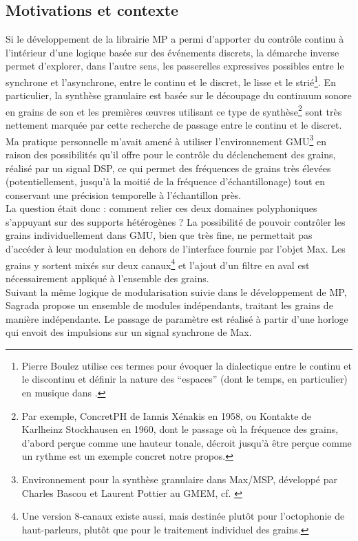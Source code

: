 \subsection{Motivations et contexte}

\noindent Si le développement de la librairie MP a permi d'apporter du contrôle continu à l'intérieur d'une logique basée sur des événements discrets, la démarche inverse permet d'explorer, dans l'autre sens, les passerelles expressives possibles entre le synchrone et l'asynchrone, entre le continu et le discret, le lisse et le strié\footnote{Pierre Boulez utilise ces termes pour évoquer la dialectique entre le continu et le discontinu et définir la nature des ``espaces'' (dont le temps, en particulier) en musique dans \cite{boulez_penser_1987}.}. En particulier, la synthèse granulaire est basée sur le découpage du continuum sonore en grains de son et les premières œuvres utilisant ce type de synthèse\footnote{Par exemple, ConcretPH de Iannis Xénakis en 1958, ou Kontakte de Karlheinz Stockhausen en 1960, dont le passage où la fréquence des grains, d'abord perçue comme une hauteur tonale, décroit jusqu'à être perçue comme un rythme est un exemple concret notre propos.} sont très nettement marquée par cette recherche de passage entre le continu et le discret.\\
\indent Ma pratique personnelle m'avait amené à utiliser l'environnement GMU\footnote{Environnement pour la synthèse granulaire dans Max/MSP, développé par Charles Bascou et Laurent Pottier au \gls{GMEM}, cf. \cite{bascou_gmu_2005}} en raison des possibilités qu'il offre pour le contrôle du déclenchement des grains, réalisé par un signal \gls{DSP}, ce qui permet des fréquences de grains très élevées (potentiellement, jusqu'à la moitié de la fréquence d'échantillonage) tout en conservant une précision temporelle à l'échantillon près.\\
\indent La question était donc : comment relier ces deux domaines polyphoniques s'appuyant sur des supports hétérogènes ? La possibilité de pouvoir contrôler les grains individuellement dans GMU, bien que très fine, ne permettait pas d'accéder à leur modulation en dehors de l'interface fournie par l'objet Max. Les grains y sortent mixés sur deux canaux\footnote{Une version 8-canaux existe aussi, mais destinée plutôt pour l'octophonie de haut-parleurs, plutôt que pour le traitement individuel des grains.} et l'ajout d'un filtre en aval est nécessairement appliqué à l'ensemble des grains.\\
\indent Suivant la même logique de modularisation suivie dans le développement de MP, Sagrada propose un ensemble de modules indépendants, traitant les grains de manière indépendante. Le passage de paramètre est réalisé à partir d'une horloge qui envoit des impulsions sur un signal synchrone de Max.

